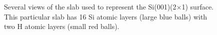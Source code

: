 \begin{figure}[t]
\centering
{}\hfill
{}\hfill
{}
\caption{Several views of the slab used to represent the Si(001)(2$\times$1)
surface. This particular slab has 16 Si atomic layers (large blue balls) with
two H atomic layers (small red balls).}
\label{fig:2x1struc}
\end{figure}

